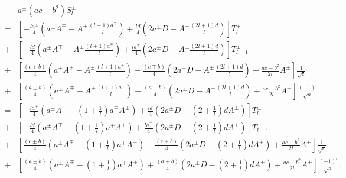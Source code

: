 \begin{align}
  ~& a^{\pm} \left(ac-b^2\right) S^{\pm}_l \nonumber \\
  =& \left[
       - \frac{l a^{\pm}}{4} \left(   a^{\pm} A^{\mp} - A^{\pm} \frac{(l+1)a^{\mp}}{l} \right)
       + \frac{l d      }{4} \left( 2 a^{\pm} D       - A^{\pm} \frac{(2l+1)d}{l}      \right)
     \right] T^{\pm}_l \nonumber \\
  +& \left[
       - \frac{l d      }{4} \left(   a^{\pm} A^{\mp} - A^{\pm} \frac{(l+1)a^{\mp}}{l} \right)
       + \frac{l a^{\mp}}{4} \left( 2 a^{\pm} D       - A^{\pm} \frac{(2l+1)d}{l}      \right)
     \right] T^{\pm}_{l-1} \nonumber \\
  +& \left[
         \frac{(c \pm b)}{4} \left(   a^{\pm} A^{\mp} - A^{\pm} \frac{(l+1)a^{\mp}}{l} \right)
       - \frac{(c \mp b)}{4} \left( 2 a^{\pm} D       - A^{\pm} \frac{(2l+1)d}{l}      \right)
       + \frac{ac-b^2}{2 l} A^{\pm}
     \right] \frac{1}{\sqrt{c}} \nonumber \\
  +& \left[
         \frac{(a \pm b)}{4} \left(   a^{\pm} A^{\mp} - A^{\pm} \frac{(l+1)a^{\mp}}{l} \right)
       + \frac{(a \mp b)}{4} \left( 2 a^{\pm} D       - A^{\pm} \frac{(2l+1)d}{l}      \right)
       + \frac{ac-b^2}{2 l} A^{\pm}
     \right] \frac{(-1)^l}{\sqrt{a}} \nonumber \\
  =& \left[
       - \frac{l a^{\pm}}{4} \left(   a^{\pm} A^{\mp} - \left(1+\frac{1}{l}\right) a^{\mp} A^{\pm} \right)
       + \frac{l d      }{4} \left( 2 a^{\pm} D       - \left(2+\frac{1}{l}\right) d       A^{\pm} \right)
     \right] T^{\pm}_l \nonumber \\
  +&  \left[
       - \frac{l d      }{4} \left(   a^{\pm} A^{\mp} - \left(1+\frac{1}{l}\right) a^{\mp} A^{\pm} \right)
       + \frac{l a^{\mp}}{4} \left( 2 a^{\pm} D       - \left(2+\frac{1}{l}\right) d       A^{\pm} \right)
     \right] T^{\pm}_{l-1} \nonumber \\
  +&  \left[
         \frac{(c \pm b)}{4} \left(   a^{\pm} A^{\mp} - \left(1+\frac{1}{l}\right) a^{\mp} A^{\pm} \right)
       - \frac{(c \mp b)}{4} \left( 2 a^{\pm} D       - \left(2+\frac{1}{l}\right) d       A^{\pm} \right)
       + \frac{ac-b^2}{2 l} A^{\pm}
     \right] \frac{1}{\sqrt{c}} \nonumber \\
  +&  \left[
         \frac{(a \pm b)}{4} \left(   a^{\pm} A^{\mp} - \left(1+\frac{1}{l}\right) a^{\mp} A^{\pm} \right)
       + \frac{(a \mp b)}{4} \left( 2 a^{\pm} D       - \left(2+\frac{1}{l}\right) d       A^{\pm} \right)
       + \frac{ac-b^2}{2 l} A^{\pm}
     \right] \frac{(-1)^l}{\sqrt{a}} \, . \nonumber
\end{align}

